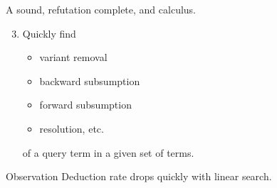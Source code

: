 

\begin{goal}
	A sound, refutation complete, and  calculus.\\[0.5em]
	\begin{enumerate}
		\setcounter{enumi}{2}
		\item Quickly find
\begin{itemize}

\item {} \hfill{\colG\footnotesize variant removal}
%

\item {}   \hfill{\colG\footnotesize backward subsumption}\\

\item {}  \hfill{\colG\footnotesize forward subsumption}\\

\item {} \hfill{\colG\footnotesize resolution, etc.}\\

\end{itemize}
of a query term in a given set of terms.
\end{enumerate}

\end{goal}


	\begin{exampleblock}{Observation}
		Deduction rate drops quickly with linear search.
	\end{exampleblock}